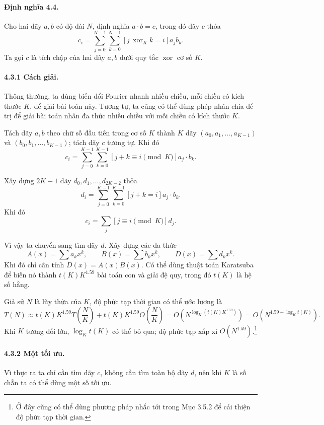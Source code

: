 \documentclass[11pt]{article}
\begin{document}
\paragraph{Định nghĩa 4.4.}
Cho hai dãy \(a,b\) có độ dài \(N\), định nghĩa \(a\cdot b=c\), trong đó dãy
\(c\) thỏa
\[
  c_i=\sum_{j=0}^{N-1}\sum_{k=0}^{N-1}
  [j\operatorname{\,xor}_K k=i]a_jb_k.
\]
Ta gọi \(c\) là tích chập của hai dãy \(a,b\) dưới quy tắc \(\operatorname{xor}\)
cơ số \(K\).

\paragraph{4.3.1 Cách giải.}
Thông thường, ta dùng biến đổi Fourier nhanh nhiều chiều, mỗi chiều có kích
thước \(K\), để giải bài toán này. Tương tự, ta cũng có thể dùng phép nhân chia
để trị để giải bài toán nhân đa thức nhiều chiều với mỗi chiều có kích thước
\(K\).

Tách dãy \(a,b\) theo chữ số đầu tiên trong cơ số \(K\) thành \(K\) dãy
\((a_0,a_1,\ldots,a_{K-1})\) và \((b_0,b_1,\ldots,b_{K-1})\); tách dãy \(c\)
tương tự. Khi đó
\[
  c_i=\sum_{j=0}^{K-1}\sum_{k=0}^{K-1}
  [j+k\equiv i\pmod K]a_j\cdot b_k.
\]

Xây dựng \(2K-1\) dãy \(d_0,d_1,\ldots,d_{2K-2}\) thỏa
\[
  d_i=\sum_{j=0}^{K-1}\sum_{k=0}^{K-1}[j+k=i]a_j\cdot b_k.
\]
Khi đó
\[
  c_i=\sum_j [j\equiv i\pmod K]d_j.
\]

Vì vậy ta chuyển sang tìm dãy \(d\). Xây dựng các đa thức
\[
  A(x)=\sum a_kx^k,\qquad B(x)=\sum b_kx^k,\qquad D(x)=\sum d_kx^k.
\]
Khi đó chỉ cần tính \(D(x)=A(x)B(x)\). Có thể dùng thuật toán Karatsuba để biến
nó thành \(t(K)K^{1.59}\) bài toán con và giải đệ quy, trong đó \(t(K)\) là hệ
số hằng.

Giả sử \(N\) là lũy thừa của \(K\), độ phức tạp thời gian có thể ước lượng là
\[
  T(N)\approx t(K)K^{1.59}T\left(\frac{N}{K}\right)
  +t(K)K^{1.59}O\left(\frac{N}{K}\right)
  =
  O\left(N^{\log_K(t(K)K^{1.59})}\right)
  =
  O\left(N^{1.59+\log_K t(K)}\right).
\]
Khi \(K\) tương đối lớn, \(\log_K t(K)\) có thể bỏ qua; độ phức tạp xấp xỉ
\(O(N^{1.59})\).\footnote{Ở đây cũng có thể dùng phương pháp nhắc tới trong
Mục 3.5.2 để cải thiện độ phức tạp thời gian.}

\paragraph{4.3.2 Một tối ưu.}
Vì thực ra ta chỉ cần tìm dãy \(c\), không cần tìm toàn bộ dãy \(d\), nên khi
\(K\) là số chẵn ta có thể dùng một số tối ưu.
\end{document}
